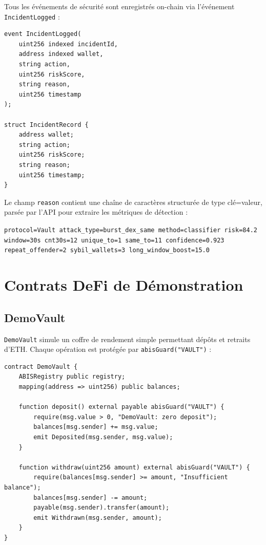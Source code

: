 \documentclass[12pt,a4paper]{report}
\newcommand{\code}[1]{\texttt{#1}}
\begin{document}
Tous les événements de sécurité sont enregistrés on-chain via l'événement \code{IncidentLogged} :

\begin{lstlisting}[language=Solidity, caption={Événement IncidentLogged}, label={lst:incident_logged}]
event IncidentLogged(
    uint256 indexed incidentId,
    address indexed wallet,
    string action,
    uint256 riskScore,
    string reason,
    uint256 timestamp
);

struct IncidentRecord {
    address wallet;
    string action;
    uint256 riskScore;
    string reason;
    uint256 timestamp;
}
\end{lstlisting}

Le champ \code{reason} contient une chaîne de caractères structurée de type clé=valeur, parsée par l'API pour extraire les métriques de détection :

\begin{codebox}
\small\texttt{protocol=Vault attack\_type=burst\_dex\_same method=classifier risk=84.2 window=30s cnt30s=12 unique\_to=1 same\_to=11 confidence=0.923 repeat\_offender=2 sybil\_wallets=3 long\_window\_boost=15.0}
\end{codebox}

\section{Contrats DeFi de Démonstration}

\subsection{DemoVault}

\code{DemoVault} simule un coffre de rendement simple permettant dépôts et retraits d'ETH. Chaque opération est protégée par \code{abisGuard("VAULT")} :

\begin{lstlisting}[language=Solidity, caption={DemoVault.sol (simplifié)}, label={lst:demo_vault}]
contract DemoVault {
    ABISRegistry public registry;
    mapping(address => uint256) public balances;

    function deposit() external payable abisGuard("VAULT") {
        require(msg.value > 0, "DemoVault: zero deposit");
        balances[msg.sender] += msg.value;
        emit Deposited(msg.sender, msg.value);
    }

    function withdraw(uint256 amount) external abisGuard("VAULT") {
        require(balances[msg.sender] >= amount, "Insufficient balance");
        balances[msg.sender] -= amount;
        payable(msg.sender).transfer(amount);
        emit Withdrawn(msg.sender, amount);
    }
}
\end{lstlisting}
\end{document}
